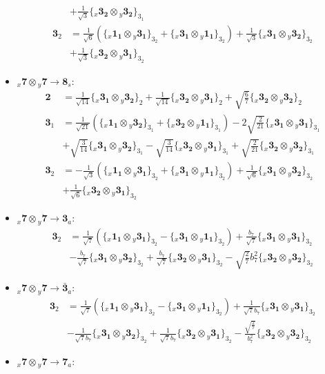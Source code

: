 \documentclass[english]{article}
\newcommand{\rep}[1]{\mathbf{#1}}
\newcommand{\repx}[2]{{}_{#2}\mathbf{#1}}
\newcommand{\subcg}[3]{\big\{ \repx{#1}{x}\otimes\repx{#2}{y}\big\}^{}_{#3}}
\begin{document}
\begin{itemize}
\begin{align*}
 & +\frac{1}{\sqrt{3}}\subcg{3_{2}}{3_{2}}{3_{1}}
\\
\rep{3}_{2} & = \frac{1}{\sqrt{6}}\left(\subcg{1_{1}}{3_{1}}{3_{2}}+\subcg{3_{1}}{1_{1}}{3_{2}}\right)+\frac{1}{\sqrt{3}}\subcg{3_{1}}{3_{2}}{3_{2}} \\ 
 & +\frac{1}{\sqrt{3}}\subcg{3_{2}}{3_{1}}{3_{2}}
\end{align*}
\item $\repx{7}{x}\otimes\repx{7}{y}\to\rep{8}_{s}$:
\begin{align*}
\rep{2} & = \frac{1}{\sqrt{14}}\subcg{3_{1}}{3_{2}}{2}+\frac{1}{\sqrt{14}}\subcg{3_{2}}{3_{1}}{2}+\sqrt{\frac{6}{7}}\subcg{3_{2}}{3_{2}}{2}
\\
\rep{3}_{1} & = \frac{1}{\sqrt{21}}\left(\subcg{1_{1}}{3_{2}}{3_{1}}+\subcg{3_{2}}{1_{1}}{3_{1}}\right)-2 \sqrt{\frac{2}{21}}\subcg{3_{1}}{3_{1}}{3_{1}} \\ 
 & +\sqrt{\frac{3}{14}}\subcg{3_{1}}{3_{2}}{3_{1}}-\sqrt{\frac{3}{14}}\subcg{3_{2}}{3_{1}}{3_{1}}+\sqrt{\frac{2}{21}}\subcg{3_{2}}{3_{2}}{3_{1}}
\\
\rep{3}_{2} & = -\frac{1}{\sqrt{3}}\left(\subcg{1_{1}}{3_{1}}{3_{2}}+\subcg{3_{1}}{1_{1}}{3_{2}}\right)+\frac{1}{\sqrt{6}}\subcg{3_{1}}{3_{2}}{3_{2}} \\ 
 & +\frac{1}{\sqrt{6}}\subcg{3_{2}}{3_{1}}{3_{2}}
\end{align*}
\item $\repx{7}{x}\otimes\repx{7}{y}\to\rep{3}_{a}$:
\begin{align*}
\rep{3}_{2} & = \frac{1}{\sqrt{7}}\left(\subcg{1_{1}}{3_{1}}{3_{2}}-\subcg{3_{1}}{1_{1}}{3_{2}}\right)+\frac{b_7}{\sqrt{7}}\subcg{3_{1}}{3_{1}}{3_{2}} \\ 
 & -\frac{b_7}{\sqrt{7}}\subcg{3_{1}}{3_{2}}{3_{2}}+\frac{b_7}{\sqrt{7}}\subcg{3_{2}}{3_{1}}{3_{2}}-\sqrt{\frac{2}{7}} b_7^2\subcg{3_{2}}{3_{2}}{3_{2}}
\end{align*}
\item $\repx{7}{x}\otimes\repx{7}{y}\to\rep{\bar{3}}_{a}$:
\begin{align*}
\rep{3}_{2} & = \frac{1}{\sqrt{7}}\left(\subcg{1_{1}}{3_{1}}{3_{2}}-\subcg{3_{1}}{1_{1}}{3_{2}}\right)+\frac{1}{\sqrt{7} b_7}\subcg{3_{1}}{3_{1}}{3_{2}} \\ 
 & -\frac{1}{\sqrt{7} b_7}\subcg{3_{1}}{3_{2}}{3_{2}}+\frac{1}{\sqrt{7} b_7}\subcg{3_{2}}{3_{1}}{3_{2}}-\frac{\sqrt{\frac{2}{7}}}{b_7^2}\subcg{3_{2}}{3_{2}}{3_{2}}
\end{align*}
\item $\repx{7}{x}\otimes\repx{7}{y}\to\rep{7}_{a}$:

\end{itemize}
\end{document}
